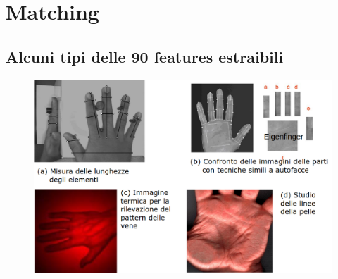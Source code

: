 \documentclass{report}
\begin{document}
\chapter{Matching}

\section{Alcuni tipi delle 90 features estraibili}
\begin{figure}[ht]
    \centering
    \includegraphics[width=1\linewidth]{images/features.png}
\end{figure}

\newpage
\end{document}
